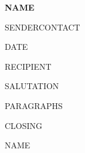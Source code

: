 \documentclass[11pt]{article}
\begin{document}
{\large\bfseries {{NAME}}}\par
\vspace{0.1em}
{\small\color{muted} {{SENDERCONTACT}}}\par
\vspace{0.2em}
{\small\color{accent} {{DATE}}}\par
\vspace{1.2em}

{{RECIPIENT}}

\vspace{1.4em}
{{SALUTATION}}\par

{{PARAGRAPHS}}

\vspace{1.8em}
{{CLOSING}}\par
\vspace{0.8em}
{{NAME}}
\end{document}
